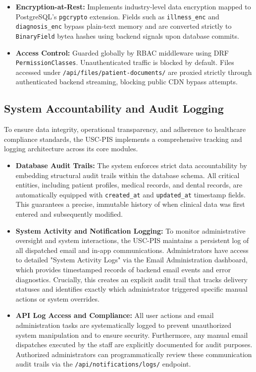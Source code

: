 \begin{itemize}
    \item \textbf{Encryption-at-Rest:} Implements industry-level data encryption mapped to PostgreSQL's \texttt{pgcrypto} extension. Fields such as \texttt{illness\_enc} and \texttt{diagnosis\_enc} bypass plain-text memory and are converted strictly to \texttt{BinaryField} bytea hashes using backend signals upon database commits.
    \item \textbf{Access Control:} Guarded globally by RBAC middleware using DRF \texttt{PermissionClasses}. Unauthenticated traffic is blocked by default. Files accessed under \texttt{/api/files/patient-documents/} are proxied strictly through authenticated backend streaming, blocking public CDN bypass attempts.
\end{itemize}

\subsection{System Accountability and Audit Logging}
To ensure data integrity, operational transparency, and adherence to healthcare compliance standards, the USC-PIS implements a comprehensive tracking and logging architecture across its core modules.

\begin{itemize}
    \item \textbf{Database Audit Trails:} The system enforces strict data accountability by embedding structural audit trails within the database schema. All critical entities, including patient profiles, medical records, and dental records, are automatically equipped with \texttt{created\_at} and \texttt{updated\_at} timestamp fields. This guarantees a precise, immutable history of when clinical data was first entered and subsequently modified.
    \item \textbf{System Activity and Notification Logging:} To monitor administrative oversight and system interactions, the USC-PIS maintains a persistent log of all dispatched email and in-app communications. Administrators have access to detailed "System Activity Logs" via the Email Administration dashboard, which provides timestamped records of backend email events and error diagnostics. Crucially, this creates an explicit audit trail that tracks delivery statuses and identifies exactly which administrator triggered specific manual actions or system overrides.
    \item \textbf{API Log Access and Compliance:} All user actions and email administration tasks are systematically logged to prevent unauthorized system manipulation and to ensure security. Furthermore, any manual email dispatches executed by the staff are explicitly documented for audit purposes. Authorized administrators can programmatically review these communication audit trails via the \texttt{/api/notifications/logs/} endpoint.
\end{itemize}

